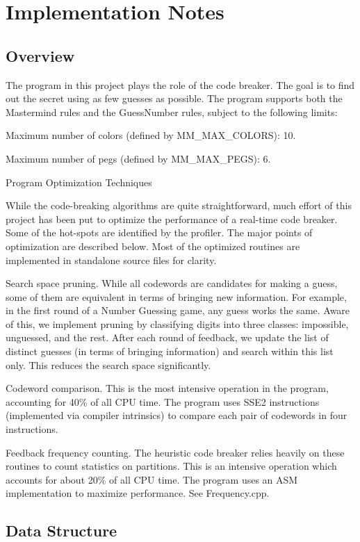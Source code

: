 \chapter{Implementation Notes}

\section{Overview}

The program in this project plays the role of the code breaker. The goal is to find out the secret using as few guesses as possible. The program supports both the Mastermind rules and the GuessNumber rules, subject to the following limits:

Maximum number of colors (defined by MM\_MAX\_COLORS): 10.

Maximum number of pegs (defined by MM\_MAX\_PEGS): 6.

Program Optimization Techniques

While the code-breaking algorithms are quite straightforward, much effort of this project has been put to optimize the performance of a real-time code breaker. Some of the hot-spots are identified by the profiler. The major points of optimization are described below. Most of the optimized routines are implemented in standalone source files for clarity.

Search space pruning. While all codewords are candidates for making a guess, some of them are equivalent in terms of bringing new information. For example, in the first round of a Number Guessing game, any guess works the same. Aware of this, we implement pruning by classifying digits into three classes: impossible, unguessed, and the rest. After each round of feedback, we update the list of distinct guesses (in terms of bringing information) and search within this list only. This reduces the search space significantly.

Codeword comparison. This is the most intensive operation in the program, accounting for 40\% of all CPU time. The program uses SSE2 instructions (implemented via compiler intrinsics) to compare each pair of codewords in four instructions.

Feedback frequency counting. The heuristic code breaker relies heavily on these routines to count statistics on partitions. This is an intensive operation which accounts for about 20\% of all CPU time. The program uses an ASM implementation to maximize performance. See Frequency.cpp.

\section{Data Structure}

